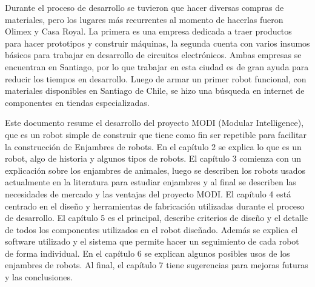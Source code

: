 Durante el proceso de desarrollo se tuvieron que hacer diversas compras de materiales, pero los lugares más recurrentes al momento de hacerlas fueron Olimex y Casa Royal. La primera es una empresa dedicada a traer productos para hacer prototipos y construir máquinas, la segunda cuenta con varios insumos básicos para trabajar en desarrollo de circuitos electrónicos. Ambas empresas se encuentran en Santiago, por lo que trabajar en esta ciudad es de gran ayuda para reducir los tiempos en desarrollo.
Luego de armar un primer robot funcional, con materiales disponibles en Santiago de Chile, se hizo una búsqueda en internet de componentes en tiendas especializadas.

Este documento resume el desarrollo del proyecto MODI (Modular Intelligence), que es un robot simple de construir que tiene como fin ser repetible para facilitar la construcción de Enjambres de robots. En el capítulo 2 se explica lo que es un robot, algo de historia y algunos tipos de robots. El capítulo 3 comienza con un explicación sobre los enjambres de animales, luego se describen los robots usados actualmente en la literatura para estudiar enjambres y al final se describen las necesidades de mercado y las ventajas del proyecto MODI. El capítulo 4 está centrado en el diseño y herramientas de fabricación utilizadas durante el proceso de desarrollo. El capítulo 5 es el principal, describe criterios de diseño y el detalle de todos los componentes utilizados en el robot diseñado. Además se explica el software utilizado y el sistema que permite hacer un seguimiento de cada robot de forma individual. En el capítulo 6 se explican algunos posibles usos de los enjambres de robots. Al final, el capítulo 7 tiene sugerencias para mejoras futuras y las conclusiones.

